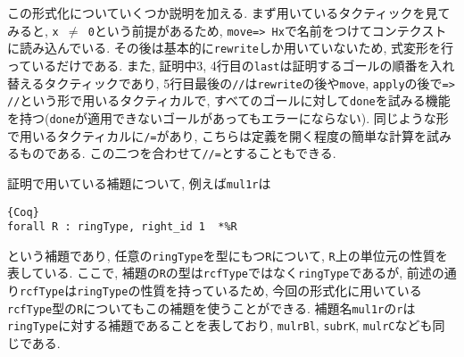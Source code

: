 \documentclass[11pt]{jsreport}
\theoremstyle{mystyle}
\newcommand{\0}{\textbf{0}}
\begin{document}
この形式化についていくつか説明を加える. まず用いているタクティックを見てみると, {\tt x $\neq$ 0}という前提があるため, {\tt move=> Hx}で名前をつけてコンテクストに読み込んでいる. その後は基本的に{\tt rewrite}しか用いていないため, 式変形を行っているだけである. また, 証明中3, 4行目の{\tt last}は証明するゴールの順番を入れ替えるタクティックであり, 5行目最後の{\tt //}は{\tt rewrite}の後や{\tt move}, {\tt apply}の後で{\tt => //}という形で用いるタクティカルで, すべてのゴールに対して{\tt done}を試みる機能を持つ({\tt done}が適用できないゴールがあってもエラーにならない). 同じような形で用いるタクティカルに{\tt /=}があり, こちらは定義を開く程度の簡単な計算を試みるものである. この二つを合わせて{\tt //=}とすることもできる. 

証明で用いている補題について, 例えば{\tt mul1r}は
\begin{lstlisting}{Coq}
forall R : ringType, right_id 1  *%R
\end{lstlisting}
という補題であり, 任意の{\tt ringType}を型にもつ{\tt R}について, {\tt R}上の単位元の性質を表している. ここで, 補題の{\tt R}の型は{\tt rcfType}ではなく{\tt ringType}であるが, 前述の通り{\tt rcfType}は{\tt ringType}の性質を持っているため, 今回の形式化に用いている{\tt rcfType}型の{\tt R}についてもこの補題を使うことができる. 補題名{\tt mul1r}の{\tt r}は{\tt ringType}に対する補題であることを表しており, {\tt mulrBl}, {\tt subrK}, {\tt mulrC}なども同じである. 
\end{document}

